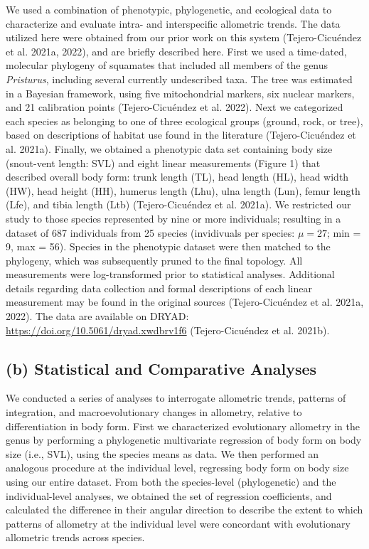 \documentclass[
  11pt,
]{article}
\begin{document}
We used a combination of phenotypic, phylogenetic, and ecological data
to characterize and evaluate intra- and interspecific allometric trends.
The data utilized here were obtained from our prior work on this system
(Tejero-Cicuéndez et al. 2021a, 2022), and are briefly described here.
First we used a time-dated, molecular phylogeny of squamates that
included all members of the genus \emph{Pristurus}, including several
currently undescribed taxa. The tree was estimated in a Bayesian
framework, using five mitochondrial markers, six nuclear markers, and 21
calibration points (Tejero-Cicuéndez et al. 2022). Next we categorized
each species as belonging to one of three ecological groups (ground,
rock, or tree), based on descriptions of habitat use found in the
literature (Tejero-Cicuéndez et al. 2021a). Finally, we obtained a
phenotypic data set containing body size (snout-vent length: SVL) and
eight linear measurements (Figure 1) that described overall body form:
trunk length (TL), head length (HL), head width (HW), head height (HH),
humerus length (Lhu), ulna length (Lun), femur length (Lfe), and tibia
length (Ltb) (Tejero-Cicuéndez et al. 2021a). We restricted our study to
those species represented by nine or more individuals; resulting in a
dataset of 687 individuals from 25 species (invidivuals per species:
\(\mu=27\); min = 9, max = 56). Species in the phenotypic dataset were
then matched to the phylogeny, which was subsequently pruned to the
final topology. All measurements were log-transformed prior to
statistical analyses. Additional details regarding data collection and
formal descriptions of each linear measurement may be found in the
original sources (Tejero-Cicuéndez et al. 2021a, 2022). The data are
available on DRYAD: \url{https://doi.org/10.5061/dryad.xwdbrv1f6}
(Tejero-Cicuéndez et al. 2021b).

\hypertarget{b-statistical-and-comparative-analyses}{%
\subsection{(b) Statistical and Comparative
Analyses}\label{b-statistical-and-comparative-analyses}}

We conducted a series of analyses to interrogate allometric trends,
patterns of integration, and macroevolutionary changes in allometry,
relative to differentiation in body form. First we characterized
evolutionary allometry in the genus by performing a phylogenetic
multivariate regression of body form on body size (i.e., SVL), using the
species means as data. We then performed an analogous procedure at the
individual level, regressing body form on body size using our entire
dataset. From both the species-level (phylogenetic) and the
individual-level analyses, we obtained the set of regression
coefficients, and calculated the difference in their angular direction
to describe the extent to which patterns of allometry at the individual
level were concordant with evolutionary allometric trends across
species. \hfill\break
\end{document}
